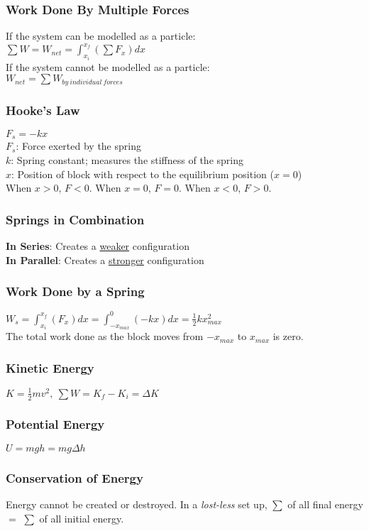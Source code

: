 \documentclass[10 pt]{article}
\begin{document}
\begin{multicols}{2}
\subsubsection*{Work Done By Multiple Forces}
\noindent If the system can be modelled as a particle:\\
$\displaystyle \sum W = W_{net} = \int_{x_i}^{x_f} \left( \sum F_x \right) dx$\\
\noindent If the system cannot be modelled as a particle:\\
$\displaystyle W_{net} = \sum W_{by~individual~forces}$
\subsubsection*{Hooke's Law}
$F_s = - kx$\\
$F_s$: Force exerted by the spring\\
$k$: Spring constant; measures the stiffness of the spring\\
$x$: Position of block with respect to the equilibrium position ($x=0$)\\
When $x>0$, $F<0$. When $x=0$, $F=0$. When $x<0$, $F>0$.
\subsubsection*{Springs in Combination}
\noindent \textbf{In Series}: Creates a \underline{weaker} configuration\\
\noindent \textbf{In Parallel}: Creates a \underline{stronger} configuration
\subsubsection*{Work Done by a Spring}
$\displaystyle W_s = \int_{x_i}^{x_f} \left( F_x \right) dx = \int_{- x_{max}}^{0} \left( -kx \right) dx = \frac{1}{2}kx_{max}^2$\\
The total work done as the block moves from $-x_{max}$ to $x_{max}$ is zero.
\subsubsection*{Kinetic Energy}
$\displaystyle K = \frac{1}{2}mv^2,~\sum W = K_f - K_i = \Delta K$
\subsubsection*{Potential Energy}
$U = mgh = mg\Delta h$
\subsubsection*{Conservation of Energy}
\noindent Energy cannot be created or destroyed. In a \textit{lost-less} set up, $\sum$ of all final energy $=$ $\sum$ of all initial energy.

\end{multicols}
\end{document}

